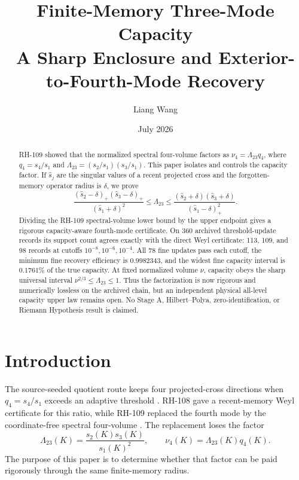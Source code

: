 \documentclass[11pt]{article}
\title{Finite-Memory Three-Mode Capacity\\\large A Sharp Enclosure and Exterior-to-Fourth-Mode Recovery}
\author{Liang Wang}\date{July 2026}
\theoremstyle{remark}\newtheorem{remark}[theorem]{Remark}
\begin{document}
\maketitle
\begin{abstract}
RH-109 showed that the normalized spectral four-volume factors as
$\nu_4=\Lambda_{23}q_4$, where
$q_4=s_4/s_1$ and
$\Lambda_{23}=(s_2/s_1)(s_3/s_1)$.  This paper isolates and controls the
capacity factor.  If $\widehat s_j$ are the singular values of a recent
projected cross and the forgotten-memory operator radius is $\delta$, we
prove
\[
 \frac{(\widehat s_2-\delta)_+(\widehat s_3-\delta)_+}
      {(\widehat s_1+\delta)^2}
 \le\Lambda_{23}\le
 \frac{(\widehat s_2+\delta)(\widehat s_3+\delta)}
      {(\widehat s_1-\delta)_+^2}.
\]
Dividing the RH-109 spectral-volume lower bound by the upper endpoint gives
a rigorous capacity-aware fourth-mode certificate.  On 360 archived
threshold-update records its support count agrees exactly with the direct
Weyl certificate: 113, 109, and 98 records at cutoffs
$10^{-8},10^{-6},10^{-4}$.  All 78 fine updates pass each cutoff, the minimum
fine recovery efficiency is $0.9982343$, and the widest fine capacity
interval is $0.1761\%$ of the true capacity.  At fixed normalized volume
$\nu$, capacity obeys the sharp universal interval
$\nu^{2/3}\le\Lambda_{23}\le1$.  Thus the factorization is now rigorous and
numerically lossless on the archived chain, but an independent physical
all-level capacity upper law remains open.  No Stage A, Hilbert--Polya,
zero-identification, or Riemann Hypothesis result is claimed.
\end{abstract}

\section{Introduction}
The source-seeded quotient route keeps four projected-cross directions when
$q_4=s_4/s_1$ exceeds an adaptive threshold
\citep{WangWeakMode2026,WangSupportLaw2026}.  RH-108 gave a recent-memory
Weyl certificate for this ratio, while RH-109 replaced the fourth mode by the
coordinate-free spectral four-volume
\citep{WangFourthCross2026,WangExterior2026}.  The replacement loses the
factor
\begin{equation}
 \Lambda_{23}(K)=\frac{s_2(K)s_3(K)}{s_1(K)^2},
 \qquad \nu_4(K)=\Lambda_{23}(K)q_4(K).
 \label{eq:factor}
\end{equation}
The purpose of this paper is to determine whether that factor can be paid
rigorously through the same finite-memory radius.
\end{document}
